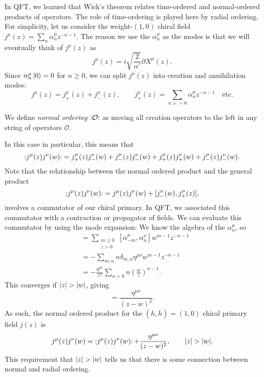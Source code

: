 In QFT, we learned that Wick's theorem relates time-ordered and normal-ordered products of operators.
The role of time-ordering is played here by radial ordering.
For simplicity, let us consider the weight-$(1, 0)$ chiral field $j^{\mu}(z) = \sum_{n} \alpha^{\mu}_n z^{-n -1}$.
The reason we use the $\alpha^{\mu}_n$ as the modes is that we will eventually think of $j^{\mu}(z)$ as 
\begin{equation}
  j^{\mu} (z) = i \sqrt{\frac{2}{\alpha'}} \partial X^{\mu}(z).
\end{equation}
Since $\alpha_n^{\mu} \ket{ 0} = 0$ for $n \geq 0$, we can split $j^{\mu}(z)$ into creation and annihilation modes:
\begin{equation}
  j^{\mu}(z) = j^{\mu}_+ (z) + j^{\mu}_-(z), \qquad j_+^\mu (z) = \sum_{n>= 0} \alpha^{\mu}_n z^{-n-1} \quad \text{etc.}
\end{equation}
\begin{definition}
  We define \emph{normal ordering} $\mathop{:}\nolimits\!\mathcal{O}\!\mathop{:}\nolimits$ as moving all creation operators to the left in any string of operators $\mathcal{O}$.
\end{definition}
In this case in particular, this means that
\begin{equation}
  \mathop{:}\nolimits\!j^{\mu}(z) j^{\nu}(w)\!\mathop{:}\nolimits = j^{\mu}_+(z) j^{\nu}_-(w) + j^{\mu}_-(z) j^\nu_-(w) + j^{\mu}_+(z) j^{\nu}_+(w) + j^{\mu}_-(z) j^{\nu}_-(w).
\end{equation}
Note that the relationship between the normal ordered product and the general product
\begin{equation}
  \mathop{:}\nolimits\!j^{\mu}(z) j^{\nu}(w)\!\mathop{:}\nolimits = j^{\mu}(z) j^{\nu}(w) + [j^{\nu}_-(w), j^{\mu}_+(z)],
\end{equation}
involves a commutator of our chiral primary. In QFT, we associated this commutator with a contraction or propagator of fields.
We can evaluate this commutator by using the mode expansion: We know the algebra of the $\alpha^{\mu}_n$, so
\begin{align}
  [j^{\mu}_-(w), j_+^{\nu}(z)] &= \sum_{\substack{m \geq 0 \\ z > 0}} [\alpha^{\mu}_{-m}, \alpha^{\nu}_{n}] w^{m-1} z^{-n-1} \\
  &= -\sum_{m, n} n \delta_{m, n} \eta^{\mu\nu} w^{m-1} z^{-n-1} \\
  &= -\frac{\eta^{\mu\nu}}{z^2} \sum_{n> 0} n \left( \frac{w}{z} \right)^{n-1}.
\end{align}
This converges if $\abs{z} > \abs{w}$, giving
\begin{equation}
  [j^{\mu}_-(w), j^{\nu}_+(z)] = \frac{\eta^{\mu\nu}}{(z - w)^2}.
\end{equation}
As such, the normal ordered product for the $(h, \overline{h}{}) = (1, 0)$ chiral primary field $j(z)$ is
\begin{equation}
  \label{eq:13-j}
  {j^{\mu}(z) j^{\nu}(w)} = \mathop{:}\nolimits\!j^{\mu}(z) j^{\nu}(w)\!\mathop{:}\nolimits + \frac{\eta^{\mu\nu}}{(z - w)^2}, \qquad \abs{z} > \abs{w}.
\end{equation}
This requirement that $\abs{z} > \abs{w}$ tells us that there is some connection between normal and radial ordering.
